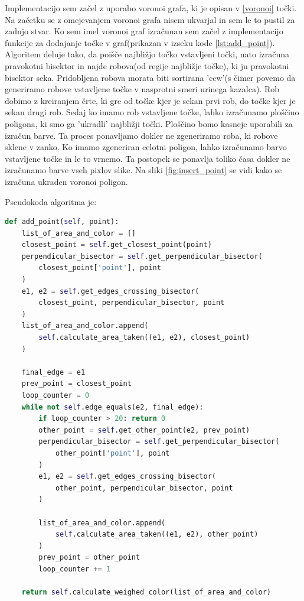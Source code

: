 \documentclass{egpubl}
\begin{document}
	Implementacijo sem začel z uporabo voronoi grafa, ki je opisan v \ref{voronoi} točki. Na začetku se z omejevanjem voronoi grafa nisem ukvarjal in sem le to pustil za zadnjo stvar. Ko sem imel voronoi graf izračunan sem začel z implementacijo funkcije za dodajanje točke v graf(prikazan v izseku kode \ref{lst:add_point}).
	Algoritem deluje tako, da poišče najbližjo točko vstavljeni točki, nato izračuna pravokotni bisektor in najde robova(od regije najbližje točke), ki ju pravokotni bisektor seka. Pridobljena robova morata biti sortirana 'ccw'(s čimer povemo da generiramo robove vstavljene točke v nasprotni smeri urinega kazalca). Rob dobimo z kreiranjem črte, ki gre od točke kjer je sekan prvi rob, do točke kjer je sekan drugi rob. Sedaj ko imamo rob vstavljene točke, lahko izračunamo ploščino poligona, ki smo ga 'ukradli' najbližji točki. Ploščino bomo kasneje uporabili za izračun barve. Ta proces ponavljamo dokler ne zgeneriramo roba, ki robove sklene v zanko. Ko imamo zgeneriran celotni poligon, lahko izračunamo barvo vstavljene točke in le to vrnemo. Ta postopek se ponavlja toliko časa dokler ne izračunamo barve vseh pixlov slike. Na sliki \ref{fig:insert_point} se vidi kako se izračuna ukraden voronoi poligon.
	
	Pseudokoda algoritma je:
	\begin{lstlisting}[language=Python,basicstyle=\tiny, caption={Pseudokoda algoritma za izračun barve točke},captionpos=b,label={lst:add_point}]
def add_point(self, point):
	list_of_area_and_color = []
	closest_point = self.get_closest_point(point)
	perpendicular_bisector = self.get_perpendicular_bisector(
		closest_point['point'], point
	)
	e1, e2 = self.get_edges_crossing_bisector(
		closest_point, perpendicular_bisector, point
	)
	list_of_area_and_color.append(
		self.calculate_area_taken((e1, e2), closest_point)
	)
	
	final_edge = e1
	prev_point = closest_point
	loop_counter = 0
	while not self.edge_equals(e2, final_edge):
		if loop_counter > 20: return 0
		other_point = self.get_other_point(e2, prev_point)
		perpendicular_bisector = self.get_perpendicular_bisector(
			other_point['point'], point
		)
		e1, e2 = self.get_edges_crossing_bisector(
			other_point, perpendicular_bisector, point
		)

		list_of_area_and_color.append(
			self.calculate_area_taken((e1, e2), other_point)
		)
		prev_point = other_point
		loop_counter += 1
	
	return self.calculate_weighed_color(list_of_area_and_color)
	\end{lstlisting}
	
\end{document}
